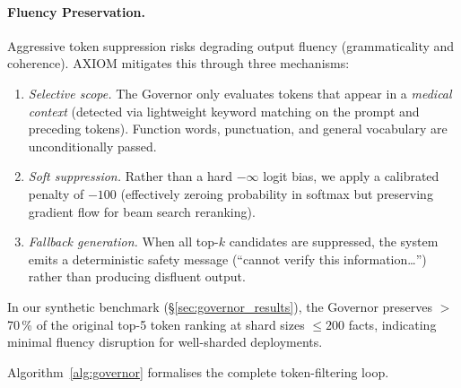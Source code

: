 \documentclass[11pt,a4paper]{article}
\begin{document}
\paragraph{Fluency Preservation.}
Aggressive token suppression risks degrading output fluency (grammaticality
and coherence).  AXIOM mitigates this through three mechanisms:
\begin{enumerate}[nosep]
    \item \emph{Selective scope.}  The Governor only evaluates tokens
          that appear in a \emph{medical context} (detected via lightweight
          keyword matching on the prompt and preceding tokens).
          Function words, punctuation, and general vocabulary are
          unconditionally passed.
    \item \emph{Soft suppression.}  Rather than a hard $-\infty$ logit
          bias, we apply a calibrated penalty of $-100$ (effectively
          zeroing probability in softmax but preserving gradient flow
          for beam search reranking).
    \item \emph{Fallback generation.}  When all top-$k$ candidates are
          suppressed, the system emits a deterministic safety message
          (``cannot verify this information\ldots'') rather than
          producing disfluent output.
\end{enumerate}
In our synthetic benchmark (\S\ref{sec:governor_results}), the Governor
preserves $>$70\,\% of the original top-5 token ranking at shard sizes
$\leq 200$ facts, indicating minimal fluency disruption for well-sharded
deployments.

Algorithm~\ref{alg:governor} formalises the complete token-filtering loop.
\end{document}
